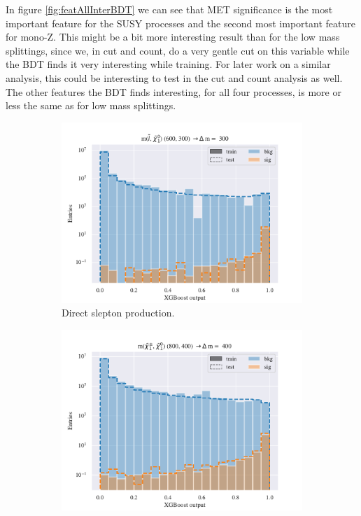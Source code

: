 In figure \ref{fig:featAllInterBDT} we can see that MET significance is the most important feature for the SUSY processes and the second most important feature for mono-Z. This might be a bit more interesting result than for the low mass splittings, since we, in cut and count, do a very gentle cut on this variable while the BDT finds it very interesting while training. For later work on a similar analysis, this could be interesting to test in the cut and count analysis as well. The other features the BDT finds interesting, for all four processes, is more or less the same as for low mass splittings. 

\begin{figure}[H]
    \centering
    \begin{subfigure}[t!]{0.49\textwidth}
        \includegraphics[width = \textwidth]{Figures/SlepSlep/ML/BDT/All_level/Inter/scaled_train_test_396014.pdf}
        \caption{Direct slepton production.}
        \label{fig:SlepslepInter}
    \end{subfigure}
    \begin{subfigure}[t!]{0.49\textwidth}
        \includegraphics[width = \textwidth]{Figures/SlepSnu/BDT/All_level/Inter/scaled_train_test_397150.pdf}

\end{subfigure}
\end{figure}
